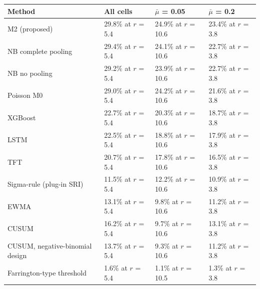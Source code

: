 \noindent\begin{minipage}{\linewidth}
\label{tab:S21_2}
\centering\footnotesize
\begin{tabular}{llll}
\toprule
Method & All cells & $\bar{\mu}$ = 0.05 & $\bar{\mu}$ = 0.2 \\ \midrule
M2 (proposed) & 29.8\% at $r$ = 5.4 & 24.9\% at $r$ = 10.6 & 23.4\% at $r$ = 3.8 \\
NB complete pooling & 29.4\% at $r$ = 5.4 & 24.1\% at $r$ = 10.6 & 22.7\% at $r$ = 3.8 \\
NB no pooling & 29.2\% at $r$ = 5.4 & 23.9\% at $r$ = 10.6 & 22.7\% at $r$ = 3.8 \\
Poisson M0 & 29.0\% at $r$ = 5.4 & 24.2\% at $r$ = 10.6 & 21.6\% at $r$ = 3.8 \\
XGBoost & 22.7\% at $r$ = 5.4 & 20.3\% at $r$ = 10.6 & 18.7\% at $r$ = 3.8 \\
LSTM & 22.5\% at $r$ = 5.4 & 18.8\% at $r$ = 10.6 & 17.9\% at $r$ = 3.8 \\
TFT & 20.7\% at $r$ = 5.4 & 17.8\% at $r$ = 10.6 & 16.5\% at $r$ = 3.8 \\
Sigma-rule (plug-in SRI) & 11.5\% at $r$ = 5.4 & 12.2\% at $r$ = 10.6 & 10.9\% at $r$ = 3.8 \\
EWMA & 13.1\% at $r$ = 5.4 & 9.8\% at $r$ = 10.6 & 11.2\% at $r$ = 3.8 \\
CUSUM & 16.2\% at $r$ = 5.4 & 9.7\% at $r$ = 10.6 & 13.1\% at $r$ = 3.8 \\
CUSUM, negative-binomial design & 13.7\% at $r$ = 5.4 & 9.3\% at $r$ = 10.6 & 11.2\% at $r$ = 3.8 \\
Farrington-type threshold & 1.6\% at $r$ = 5.4 & 1.1\% at $r$ = 10.5 & 1.3\% at $r$ = 3.8 \\
\bottomrule
\end{tabular}
\end{minipage}
\vspace{14pt}

